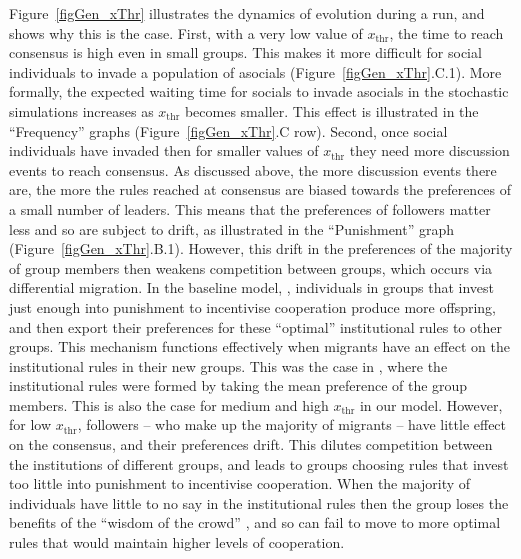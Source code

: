 \documentclass{rstb}
\begin{document}
\begin{linenumbers}
Figure~\ref{figGen_xThr} illustrates the dynamics of evolution during a run, and shows why this is the case. First, with a very low value of $x_\mathrm{thr}$, the time to reach consensus is high even in small groups. This makes it more difficult for social individuals to invade a population of asocials (Figure~\ref{figGen_xThr}.C.1). More formally, the expected waiting time for socials to invade asocials in the stochastic simulations increases as $x_\mathrm{thr}$ becomes smaller. This effect is illustrated in the ``Frequency'' graphs (Figure~\ref{figGen_xThr}.C row). Second, once social individuals have invaded then for smaller values of $x_\mathrm{thr}$ they need more discussion events to reach consensus. As discussed above, the more discussion events there are, the more the rules reached at consensus are biased towards the preferences of a small number of leaders. This means that the preferences of followers matter less and so are subject to drift, as illustrated in the ``Punishment'' graph (Figure~\ref{figGen_xThr}.B.1). However, this drift in the preferences of the majority of group members then weakens competition between groups, which occurs via differential migration. In the baseline model, \cite{Powers:2013:a}, individuals in groups that invest just enough into punishment to incentivise cooperation produce more offspring, and then export their preferences for these ``optimal'' institutional rules to other groups. This mechanism functions effectively when migrants have an effect on the institutional rules in their new groups. This was the case in \cite{Powers:2013:a}, where the institutional rules were formed by taking the mean preference of the group members. This is also the case for medium and high $x_\mathrm{thr}$ in our model. However, for low $x_\mathrm{thr}$, followers -- who make up the majority of migrants -- have little effect on the consensus, and their preferences drift. This dilutes competition between the institutions of different groups, and leads to groups choosing rules that invest too little into punishment to incentivise cooperation. When the majority of individuals have little to no say in the institutional rules then the group loses the benefits of the ``wisdom of the crowd'' \cite{Ober:2008:a}, and so can fail to move to more optimal rules that would maintain higher levels of cooperation. 


\end{linenumbers}
\end{document}
